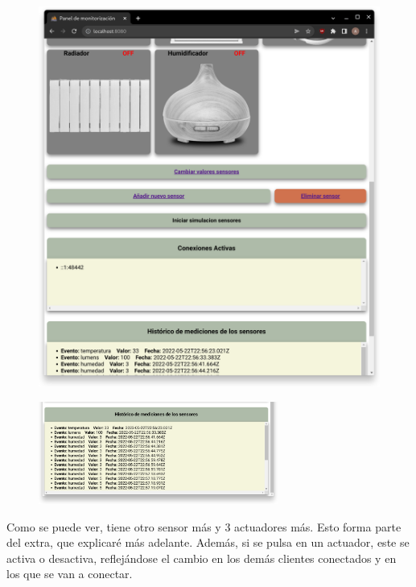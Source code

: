 \documentclass{article}
\begin{document}
\begin{figure}[H]
\begin{minipage}[H]{0.49\textwidth}
        \includegraphics[width=\textwidth]{images/pagina2.png}
    \end{minipage}
\end{figure}

\begin{figure}[H]
    \centering
    \includegraphics[width=0.7\textwidth]{images/pagina3.png}
\end{figure}

Como se puede ver, tiene otro sensor más y 3 actuadores más. Esto forma parte del extra, que explicaré más adelante. Además, si se pulsa en un actuador, este se activa o desactiva, reflejándose el cambio en los demás clientes conectados y en los que se van a conectar.
\end{document}

